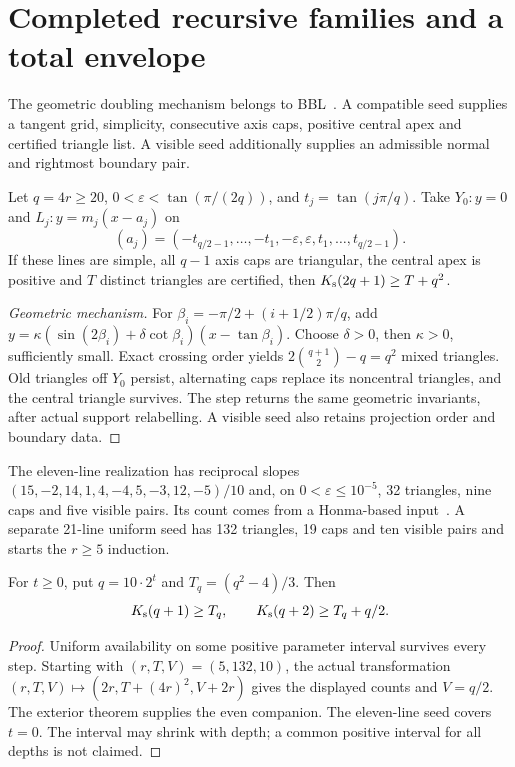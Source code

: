 \section{Completed recursive families and a total envelope}
\label{jfam:section}

The geometric doubling mechanism belongs to BBL~\cite{bbl2008}. A compatible seed supplies a tangent grid, simplicity, consecutive axis caps, positive central apex and certified triangle list. A visible seed additionally supplies an admissible normal and rightmost boundary pair.

\begin{theorem}\label{jfam:doubling}
Let $q=4r\ge20$, $0<\varepsilon<\tan(\pi/(2q))$, and $t_j=\tan(j\pi/q)$. Take $Y_0:y=0$ and $L_j:y=m_j(x-a_j)$ on
\[
 (a_j)=(-t_{q/2-1},\ldots,-t_1,-\varepsilon,\varepsilon,t_1,\ldots,t_{q/2-1}).
\]
If these lines are simple, all $q-1$ axis caps are triangular, the central apex is positive and $T$ distinct triangles are certified, then $K_{\mathrm s}(2q+1)\ge T+q^2$.
\end{theorem}
\begin{proof}[Geometric mechanism]
For $\beta_i=-\pi/2+(i+1/2)\pi/q$, add
$y=\kappa(\sin(2\beta_i)+\delta\cot\beta_i)(x-\tan\beta_i)$.
Choose $\delta>0$, then $\kappa>0$, sufficiently small. Exact crossing order yields $2\binom{q+1}{2}-q=q^2$ mixed triangles. Old triangles off $Y_0$ persist, alternating caps replace its noncentral triangles, and the central triangle survives. The step returns the same geometric invariants, after actual support relabelling. A visible seed also retains projection order and boundary data.
\end{proof}

The eleven-line realization has reciprocal slopes
$(15,-2,14,1,4,-4,5,-3,12,-5)/10$ and, on $0<\varepsilon\le10^{-5}$, 32 triangles, nine caps and five visible pairs. Its count comes from a Honma-based input~\cite{savchuk2025}. A separate 21-line uniform seed has 132 triangles, 19 caps and ten visible pairs and starts the $r\ge5$ induction.

\begin{theorem}\label{jfam:recursive}
For $t\ge0$, put $q=10\cdot2^t$ and $T_q=(q^2-4)/3$. Then
\begin{equation}\label{jfam:families}
 K_{\mathrm s}(q+1)\ge T_q,\qquad K_{\mathrm s}(q+2)\ge T_q+q/2.
\end{equation}
\end{theorem}
\begin{proof}
Uniform availability on some positive parameter interval survives every step. Starting with $(r,T,V)=(5,132,10)$, the actual transformation
$(r,T,V)\mapsto(2r,T+(4r)^2,V+2r)$
gives the displayed counts and $V=q/2$. The exterior theorem supplies the even companion. The eleven-line seed covers $t=0$. The interval may shrink with depth; a common positive interval for all depths is not claimed.
\end{proof}

